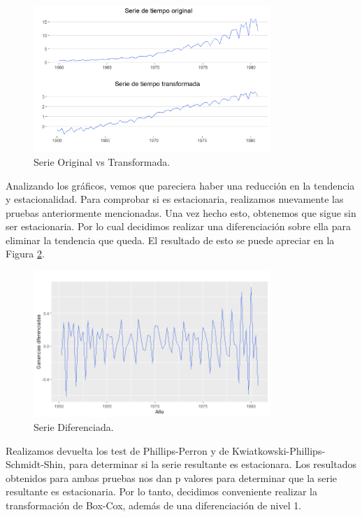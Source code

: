 \documentclass{article} %
\begin{document}
\begin{figure}[H]
	\centering
	\includegraphics[width=0.8\textwidth]{images/4-6 Transformada}
	\caption{Serie Original vs Transformada.}
	\label{fig:Transformada}
\end{figure} 

Analizando los gráficos, vemos que pareciera haber una reducción en la tendencia y estacionalidad. Para comprobar si es estacionaria, realizamos nuevamente las pruebas anteriormente mencionadas. Una vez hecho esto, obtenemos que sigue sin ser estacionaria. Por lo cual decidimos realizar una diferenciación sobre ella para eliminar la tendencia que queda. El resultado de esto se puede apreciar en la Figura \ref{fig:Diferenciada}. 

\begin{figure}[H]
	\centering
	\includegraphics[width=0.8\textwidth]{images/4-7 Diferenciada}
	\caption{Serie Diferenciada.}
	\label{fig:Diferenciada}
\end{figure} 

Realizamos devuelta los test de Phillips-Perron y de Kwiatkowski-Phillips-Schmidt-Shin, para determinar si la serie resultante es estacionara. Los resultados obtenidos para ambas pruebas nos dan p valores para determinar que la serie resultante es estacionaria. Por lo tanto, decidimos conveniente realizar la transformación de Box-Cox, además de una diferenciación de nivel 1.
\end{document}
